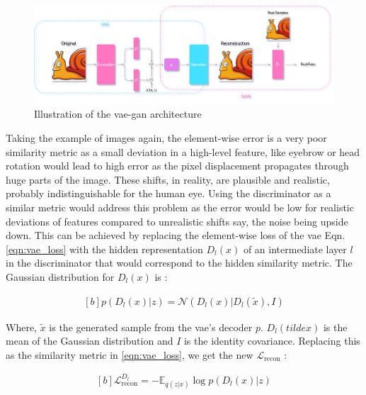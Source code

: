 \begin{figure}[h]
    \centering
    \includegraphics[scale=0.15]{figures/arch/vae_gan_arch.png}
    \caption{Illustration of the \ac{vae}-\ac{gan} architecture}
    \label{fig:vae_gan_arch}
\end{figure}

Taking the example of images again, the element-wise error is a very poor similarity metric as a small deviation in a high-level feature, like eyebrow or head rotation would lead to high error as the pixel displacement propagates through huge parts of the image. These shifts, in reality, are plausible and realistic, probably indistinguishable for the human eye. Using the discriminator as a similar metric would address this problem as the error would be low for realistic deviations of features compared to unrealistic shifts say, the noise being upside down. This can be achieved by replacing the element-wise loss of the \ac{vae} Eqn. \ref{eqn:vae_loss} with the hidden representation $D_{l}(x)$ of an intermediate layer $l$ in the discriminator that would correspond to the hidden similarity metric. The Gaussian distribution for $D_{l}(x)$ is :
    
\begin{equation} \label{eqn:gan_similarity}
    \begin{aligned}[b]
        p\left(D_{l}(x) | z\right)=\mathcal{N}\left(D_{l}(x) | D_{l}(\tilde{x}), I\right)
    \end{aligned}
\end{equation}

Where, $\tilde{x}$ is the generated sample from the \ac{vae}'s decoder $p$. $D_{l}(tilde{x})$ is the mean of the Gaussian distribution and $I$ is the identity covariance. Replacing this as the similarity metric in \ref{eqn:vae_loss}, we get the new $\mathcal{L}_{\text {recon}}$ :

\begin{equation} \label{eqn:vaegan_recon}
    \begin{gathered}[b]
        \mathcal{L}_{\text {recon}}^{D_{l}}=-\mathbb{E}_{q(z | x)} \log p\left(D_{l}(x) | z\right)
    \end{gathered}
\end{equation}


